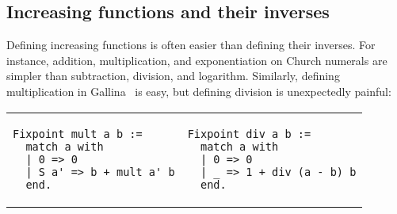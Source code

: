 
\subsection{Increasing functions and their inverses}
\label{sec:incfuncinv}
Defining increasing functions is often easier than defining their inverses.
For instance, addition, multiplication, and exponentiation on Church numerals
are simpler than subtraction, division, and logarithm. Similarly, defining multiplication in Gallina~\cite{coq} is easy, but defining division is unexpectedly painful:

\begin{minipage}[c]{0.4\textwidth}
\begin{tabular}{@{}l@{}@{\qquad \qquad}l}
\begin{lstlisting}
Fixpoint mult a b :=
  match a with
  | 0 => 0
  | S a' => b + mult a' b
  end.
\end{lstlisting}
&
\begin{lstlisting}
Fixpoint div a b :=
  match a with
  | 0 => 0
  | _ => 1 + div (a - b) b
  end.
\end{lstlisting}
\end{tabular} \\[5pt]
\end{minipage}

